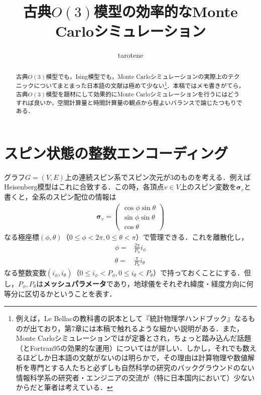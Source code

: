 \documentclass[a4,10pt, platex, dvipdfmx]{jsarticle}
\title{古典$ O\left(3\right) $模型の効率的なMonte Carloシミュレーション}
\author{tarotene}
\newcommand{\spin}{\bm{\sigma}}
\begin{document}
    \maketitle

    \begin{abstract}
        古典$ O\left(3\right) $模型でも，Ising模型でも，Monte Carloシミュレーションの実際上のテクニックについてまとまった日本語の文献は極めて少ない\footnote{例えば，Le Bellacの教科書\cite{LeBellac2004}の訳本として『統計物理学ハンドブック』\cite{LeBellac2007JP}なるものが出ており，第7章には本稿で触れるような細かい説明がある．また，Monte Carloシミュレーションでは\cite{Landau2014}が定番とされ，ちょっと踏み込んだ話題（とFortran95の効果的な運用）については\cite{Berg2004}が詳しい．しかし，それでも数えるほどしか日本語の文献がないのは明らかで，その理由は計算物理や数値解析を専門とする人たちと必ずしも自然科学の研究のバックグラウンドのない情報科学系の研究者・エンジニアの交流が（特に日本国内において）少ないからだと筆者は考えている．}．本稿ではメモ書きがてら，古典$ O\left(3\right) $模型を題材にして効果的にMonte Carloシミュレーションを行うにはどうすれば良いか，空間計算量と時間計算量の観点から程よいバランスで論じたつもりである．
    \end{abstract}

    \tableofcontents

    \section{スピン状態の整数エンコーディング}

    グラフ$ G = \left( V, E \right) $上の連続スピン系でスピン次元が$3$のものを考える．例えばHeisenberg模型はこれに合致する．この時，各頂点$ v \in V $上のスピン変数を$ \spin_{v} $と書くと，全系のスピン配位の情報は
    \begin{align}
        \spin_{v} =
        \begin{pmatrix}
            \cos \phi \sin \theta \\
            \sin \phi \sin \theta \\
            \cos \theta
        \end{pmatrix}\label{eq:polar-decardes}
    \end{align}
    なる極座標$\left(\phi, \theta\right)$（$0 \leq \phi < 2\pi, 0 \leq \theta < \pi$）で管理できる．これを離散化し，
    \begin{align}
        \phi = & \frac{2 \pi}{P_{\phi}} i_{\phi}\\
        \theta = & \frac{\pi}{P_{\theta}} i_{\theta}
    \end{align}
    なる整数変数$\left(i_{\phi}, i_{\theta}\right)$（$0 \leq i_{\phi} < P_{\phi}, 0 \leq i_{\theta} < P_{\theta}$）で持っておくことにする．但し，$ P_{\phi}, P_{\theta} $は\textbf{メッシュパラメータ}であり，地球儀をそれぞれ緯度・経度方向に何等分に区切るかということを表す．
\end{document}
